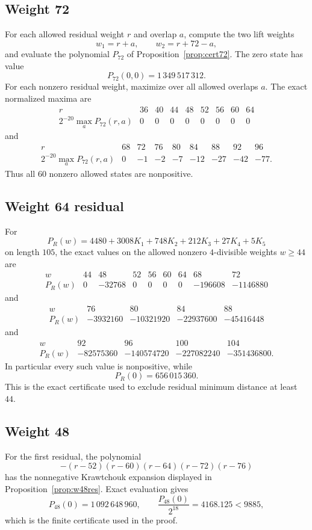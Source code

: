 \documentclass[11pt,reqno]{amsart}
\theoremstyle{remark}
\begin{document}
\subsection{Weight 72}
For each allowed residual weight $r$ and overlap $a$, compute the two lift weights
\[
w_1=r+a,
\qquad
w_2=r+72-a,
\]
and evaluate the polynomial $P_{72}$ of Proposition~\ref{prop:cert72}.  The zero state has value
\[
P_{72}(0,0)=1\,349\,517\,312.
\]
For each nonzero residual weight, maximize over all allowed overlaps $a$.  The exact normalized maxima are
\[
\begin{array}{c|rrrrrrrr}
r&36&40&44&48&52&56&60&64\\\hline
2^{-20}\max_a P_{72}(r,a)&0&0&0&0&0&0&0&0
\end{array}
\]
and
\[
\begin{array}{c|rrrrrrrr}
r&68&72&76&80&84&88&92&96\\\hline
2^{-20}\max_a P_{72}(r,a)&0&-1&-2&-7&-12&-27&-42&-77.
\end{array}
\]
Thus all $60$ nonzero allowed states are nonpositive.

\subsection{Weight 64 residual}
For
\[
P_R(w)=4480+3008K_1+748K_2+212K_3+27K_4+5K_5
\]
on length $105$, the exact values on the allowed nonzero $4$-divisible weights $w\ge44$ are
\[
\begin{array}{c|rrrrrrrr}
w&44&48&52&56&60&64&68&72\\\hline
P_R(w)&0&-32768&0&0&0&0&-196608&-1146880
\end{array}
\]
and
\[
\begin{array}{c|rrrr}
w&76&80&84&88\\\hline
P_R(w)&-3932160&-10321920&-22937600&-45416448
\end{array}
\]
and
\[
\begin{array}{c|rrrr}
w&92&96&100&104\\\hline
P_R(w)&-82575360&-140574720&-227082240&-351436800.
\end{array}
\]
In particular every such value is nonpositive, while
\[
P_R(0)=656\,015\,360.
\]
This is the exact certificate used to exclude residual minimum distance at least $44$.

\subsection{Weight 48}
For the first residual, the polynomial
\[
-(r-52)(r-60)(r-64)(r-72)(r-76)
\]
has the nonnegative Krawtchouk expansion displayed in Proposition~\ref{prop:w48res}.  Exact evaluation gives
\[
P_{48}(0)=1\,092\,648\,960,
\qquad
\frac{P_{48}(0)}{2^{18}}=4168.125<9885,
\]
which is the finite certificate used in the proof.
\end{document}
